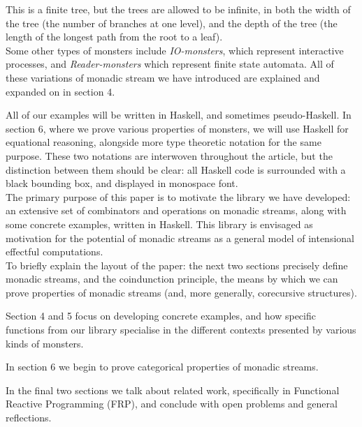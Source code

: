 This is a finite tree, but the trees are allowed to be infinite, in both the width of the tree (the number of branches at one level), and the depth of the tree (the length of the longest path from the root to a leaf). \\

Some other types of monsters include \emph{IO-monsters}, which represent interactive processes, and \emph{Reader-monsters} which represent finite state automata. All of these variations of monadic stream we have introduced are explained and expanded on in section 4.

All of our examples will be written in Haskell, and sometimes pseudo-Haskell. In section 6, where we prove various properties of monsters, we will use Haskell for equational reasoning, alongside more type theoretic notation for the same purpose. These two notations are interwoven throughout the article, but the distinction between them should be clear: all Haskell code is surrounded with a black bounding box, and displayed in monospace font. \\

The primary purpose of this paper is to motivate the library we have developed: an extensive set of combinators and operations on monadic streams, along with some concrete examples, written in Haskell. This library is envisaged as motivation for the potential of monadic streams as a general model of intensional effectful computations. \\

To briefly explain the layout of the paper: the next two sections precisely define monadic streams, and the coindunction principle, the means by which we can prove properties of monadic streams (and, more generally, corecursive structures). 

Section 4 and 5 focus on developing concrete examples, and how specific functions from our library specialise in the different contexts presented by various kinds of monsters. 

In section 6 we begin to prove categorical properties of monadic streams. 

In the final two sections we talk about related work, specifically in Functional Reactive Programming (FRP), and conclude with open problems and general reflections.
